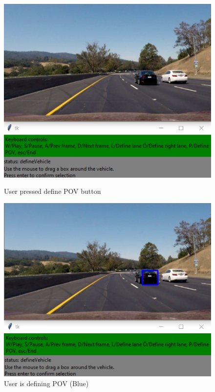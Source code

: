 \begin{figure}[H]
\centering
\begin{minipage}[b]{0.45\linewidth}
    \includegraphics[width=\textwidth]{Figures/define_vehicle_1.jpg}
    \caption*{User pressed define POV button}
\end{minipage}
\begin{minipage}[b]{0.45\linewidth}
    \includegraphics[width=\textwidth]{Figures/define_vehicle_2.jpg}
    \caption*{User is defining POV (Blue)}
\end{minipage}

\end{figure}
